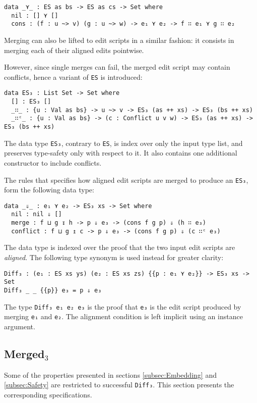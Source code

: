 \documentclass[../Thesis.tex]{subfiles}
\begin{document}
\begin{verbatim}
data _⋎_ : ES as bs -> ES as cs -> Set where
  nil : [] ⋎ []
  cons : (f : u ~> v) (g : u ~> w) -> e₁ ⋎ e₂ -> f ∷ e₁ ⋎ g ∷ e₂ 
\end{verbatim}

	Merging can also be lifted to edit scripts in a similar fashion: it
	consists in merging each of their aligned edits pointwise.
	
	However, since single merges can fail, the merged edit
	script may contain conflicts, hence a variant of \texttt{ES} 
	is introduced:
	\begin{verbatim}
data ES₃ : List Set -> Set where
  [] : ES₃ []
  _∷_ : {u : Val as bs} -> u ~> v -> ES₃ (as ++ xs) -> ES₃ (bs ++ xs)
  _∷ᶜ_ : {u : Val as bs} -> (c : Conflict u v w) -> ES₃ (as ++ xs) -> ES₃ (bs ++ xs)
	\end{verbatim}
	
	The data type \texttt{ES₃}, contrary to \texttt{ES}, is index over only 
	the input type list, and preserves type-safety only with respect to it.
	It also contains one additional constructor to include conflicts.
	
	The rules that specifies how aligned edit scripts are merged to produce
	an \texttt{ES₃}, form the following data type:
	
\begin{verbatim}
data _⇓_ : e₁ ⋎ e₂ -> ES₃ xs -> Set where
  nil : nil ⇓ []
  merge : f ⊔ g ↧ h -> p ⇓ e₃ -> (cons f g p) ⇓ (h ∷ e₃)
  conflict : f ⊔ g ↥ c -> p ⇓ e₃ -> (cons f g p) ⇓ (c ∷ᶜ e₃)
\end{verbatim}

	The data type is indexed over the proof that the two input edit scripts are
	\emph{aligned}. 
	The following type synonym is used instead for greater clarity:
\begin{verbatim}
Diff₃ : (e₁ : ES xs ys) (e₂ : ES xs zs) {{p : e₁ ⋎ e₂}} -> ES₃ xs -> Set
Diff₃ _ _ {{p}} e₃ = p ⇓ e₃
\end{verbatim}
	The type \texttt{Diff₃ e₁ e₂ e₃} is the proof that \texttt{e₃} is the edit script
	produced by merging \texttt{e₁} and \texttt{e₂}. The alignment condition is 
	left implicit using	 an instance argument.
	
	\subsection{Merged$_3$}
	\label{subsec:Merged3}
	Some of the properties presented in sections \ref{subsec:Embedding} and 
	\ref{subsec:Safety} are restricted to successful \texttt{Diff₃}.
	This section presents the corresponding specifications.
\end{document}
